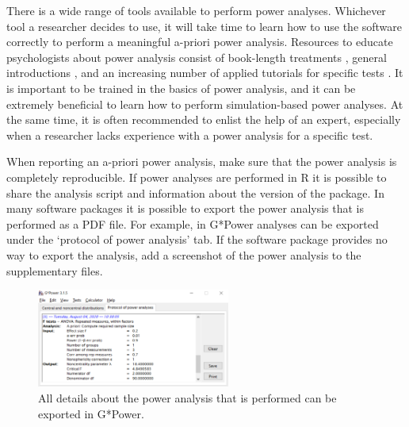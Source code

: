 \documentclass[
]{krantz}
\begin{document}
There is a wide range of tools available to perform power analyses. Whichever tool a researcher decides to use, it will take time to learn how to use the software correctly to perform a meaningful a-priori power analysis. Resources to educate psychologists about power analysis consist of book-length treatments \citep{aberson_applied_2019, cohen_statistical_1988, murphy_statistical_2014, julious_sample_2004}, general introductions \citep{maxwell_sample_2008, brysbaert_how_2019-1, perugini_practical_2018, faul_gpower_2007, baguley_understanding_2004}, and an increasing number of applied tutorials for specific tests \citep{debruine_understanding_2021, lakens_simulation-based_2021, green_simr_2016, brysbaert_power_2018, westfall_statistical_2014, schoemann_determining_2017, kruschke_bayesian_2013}. It is important to be trained in the basics of power analysis, and it can be extremely beneficial to learn how to perform simulation-based power analyses. At the same time, it is often recommended to enlist the help of an expert, especially when a researcher lacks experience with a power analysis for a specific test.

When reporting an a-priori power analysis, make sure that the power analysis is completely reproducible. If power analyses are performed in R it is possible to share the analysis script and information about the version of the package. In many software packages it is possible to export the power analysis that is performed as a PDF file. For example, in G*Power analyses can be exported under the `protocol of power analysis' tab. If the software package provides no way to export the analysis, add a screenshot of the power analysis to the supplementary files.

\begin{figure}

{\centering \includegraphics[width=240px]{images/gpowprotocol} 

}

\caption{All details about the power analysis that is performed can be exported in G*Power.}\label{fig:gpowprotocol}
\end{figure}
\end{document}
